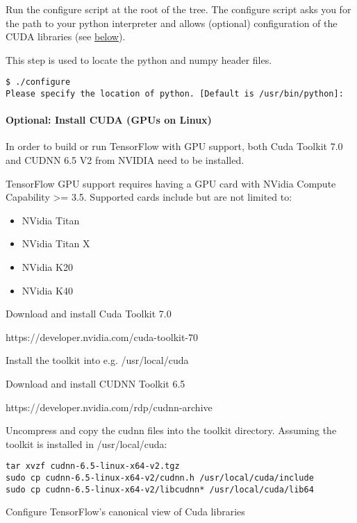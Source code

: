 Run the configure script at the root of the tree. The configure script asks you for the path to your python interpreter and allows (optional) configuration of the CUDA libraries (see \hyperref[install_cuda]{below}).

This step is used to locate the python and numpy header files.

\begin{lstlisting}
$ ./configure
Please specify the location of python. [Default is /usr/bin/python]:
\end{lstlisting}

\paragraph{Optional: Install CUDA (GPUs on Linux)} \label{install_cuda}

In order to build or run TensorFlow with GPU support, both Cuda Toolkit 7.0 and CUDNN 6.5 V2 from NVIDIA need to be installed.

TensorFlow GPU support requires having a GPU card with NVidia Compute Capability >= 3.5. Supported cards include but are not limited to:

\begin{itemize}
\item NVidia Titan
\item NVidia Titan X
\item NVidia K20
\item NVidia K40
\end{itemize}

Download and install Cuda Toolkit 7.0

https://developer.nvidia.com/cuda-toolkit-70

Install the toolkit into e.g. /usr/local/cuda

Download and install CUDNN Toolkit 6.5

https://developer.nvidia.com/rdp/cudnn-archive

Uncompress and copy the cudnn files into the toolkit directory. Assuming the toolkit is installed in /usr/local/cuda:

\begin{lstlisting}
tar xvzf cudnn-6.5-linux-x64-v2.tgz
sudo cp cudnn-6.5-linux-x64-v2/cudnn.h /usr/local/cuda/include
sudo cp cudnn-6.5-linux-x64-v2/libcudnn* /usr/local/cuda/lib64
\end{lstlisting}

Configure TensorFlow's canonical view of Cuda libraries


